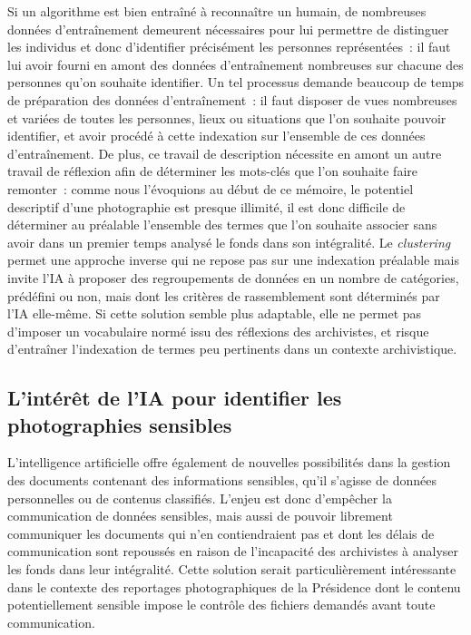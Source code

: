 Si un algorithme est bien entraîné à reconnaître un humain, de nombreuses données d’entraînement demeurent nécessaires pour lui permettre de distinguer les individus et donc d’identifier précisément les personnes représentées : il faut lui avoir fourni en amont des données d’entraînement nombreuses sur chacune des personnes qu’on souhaite identifier. Un tel processus demande beaucoup de temps de préparation des données d’entraînement : il faut disposer de vues nombreuses et variées de toutes les personnes, lieux ou situations que l’on souhaite pouvoir identifier, et avoir procédé à cette indexation sur l’ensemble de ces données d’entraînement. De plus, ce travail de description nécessite en amont un autre travail de réflexion afin de déterminer les mots-clés que l’on souhaite faire remonter : comme nous l’évoquions au début de ce mémoire, le potentiel descriptif d’une photographie est presque illimité, il est donc difficile de déterminer au préalable l’ensemble des termes que l’on souhaite associer sans avoir dans un premier temps analysé le fonds dans son intégralité. Le \emph{clustering} permet une approche inverse qui ne repose pas sur une indexation préalable mais invite l’IA à proposer des regroupements de données en un nombre de catégories, prédéfini ou non, mais dont les critères de rassemblement sont déterminés par l’IA elle-même. Si cette solution semble plus adaptable, elle ne permet pas d’imposer un vocabulaire normé issu des réflexions des archivistes, et risque d’entraîner l’indexation de termes peu pertinents dans un contexte archivistique.

\subsection*{L'intérêt de l'IA pour identifier les photographies sensibles}

L’intelligence artificielle offre également de nouvelles possibilités dans la gestion des documents contenant des informations sensibles, qu'il s'agisse de données personnelles ou de contenus classifiés. L’enjeu est donc d’empêcher la communication de données sensibles, mais aussi de pouvoir librement communiquer les documents qui n’en contiendraient pas et dont les délais de communication sont repoussés en raison de l’incapacité des archivistes à analyser les fonds dans leur intégralité. Cette solution serait particulièrement intéressante dans le contexte des reportages photographiques de la Présidence dont le contenu potentiellement sensible impose le contrôle des fichiers demandés avant toute communication. 

